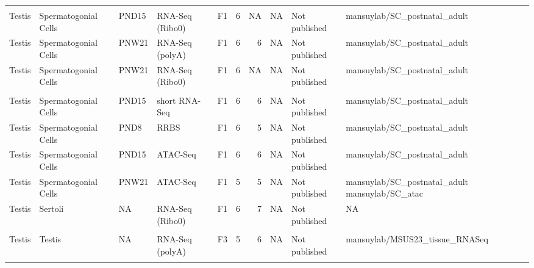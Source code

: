 \documentclass[12pt,twoside]{reedthesis}
\begin{document}
\begin{table}[H]
{\begin{tabular}[t]{lllllrrlll}
\cellcolor{gray!6}{mansuylab/SC\_longRNA}\\
Testis & Spermatogonial Cells & PND15 & RNA-Seq (Ribo0) & F1 & 6 & NA & NA & Not published & mansuylab/SC\_postnatal\_adult\\
\addlinespace
Testis & Spermatogonial Cells & PNW21 & RNA-Seq (polyA) & F1 & 6 & 6 & NA & Not published & mansuylab/SC\_postnatal\_adult
\cellcolor{gray!6}{mansuylab/SC\_adult}\\
Testis & Spermatogonial Cells & PNW21 & RNA-Seq (Ribo0) & F1 & 6 & NA & NA & Not published & mansuylab/SC\_postnatal\_adult\\
\cellcolor{gray!6}{Testis} & \cellcolor{gray!6}{Spermatogonial Cells} & \cellcolor{gray!6}{PND8} & \cellcolor{gray!6}{short RNA-Seq} & \cellcolor{gray!6}{F1} & \cellcolor{gray!6}{8} & \cellcolor{gray!6}{7} & \cellcolor{gray!6}{NA} & \cellcolor{gray!6}{Not published} & \cellcolor{gray!6}{mansuylab/SC\_postnatal\_adult}\\
Testis & Spermatogonial Cells & PND15 & short RNA-Seq & F1 & 6 & 6 & NA & Not published & mansuylab/SC\_postnatal\_adult\\
Testis & Spermatogonial Cells & PND8 & RRBS & F1 & 6 & 5 & NA & Not published & mansuylab/SC\_postnatal\_adult
\cellcolor{gray!6}{mansuylab/ssc\_pnd8\_RRBS}\\
\addlinespace
Testis & Spermatogonial Cells & PND15 & ATAC-Seq & F1 & 6 & 6 & NA & Not published & mansuylab/SC\_postnatal\_adult
\cellcolor{gray!6}{mansuylab/SC\_atac}\\
Testis & Spermatogonial Cells & PNW21 & ATAC-Seq & F1 & 5 & 5 & NA & Not published & mansuylab/SC\_postnatal\_adult
mansuylab/SC\_atac\\
Testis & Sertoli & NA & RNA-Seq (Ribo0) & F1 & 6 & 7 & NA & Not published & NA\\
\cellcolor{gray!6}{Testis} & \cellcolor{gray!6}{Testis} & \cellcolor{gray!6}{NA} & \cellcolor{gray!6}{RNA-Seq (polyA)} & \cellcolor{gray!6}{F1} & \cellcolor{gray!6}{5} & \cellcolor{gray!6}{5} & \cellcolor{gray!6}{NA} & \cellcolor{gray!6}{Not published} & \cellcolor{gray!6}{mansuylab/MSUS23\_tissue\_RNASeq}\\
Testis & Testis & NA & RNA-Seq (polyA) & F3 & 5 & 6 & NA & Not published & mansuylab/MSUS23\_tissue\_RNASeq\\
\addlinespace
\cellcolor{gray!6}{Liver} & \cellcolor{gray!6}{Liver} & \cellcolor{gray!6}{NA} & \cellcolor{gray!6}{RNA-Seq (polyA)} & \cellcolor{gray!6}{F1} & \cellcolor{gray!6}{5} & \cellcolor{gray!6}{5} & \cellcolor{gray!6}{NA} & \cellcolor{gray!6}{Not published} & \cellcolor{gray!6}{mansuylab/MSUS23\_tissue\_RNASeq}\\

\end{tabular}}
\end{table}
\end{document}
